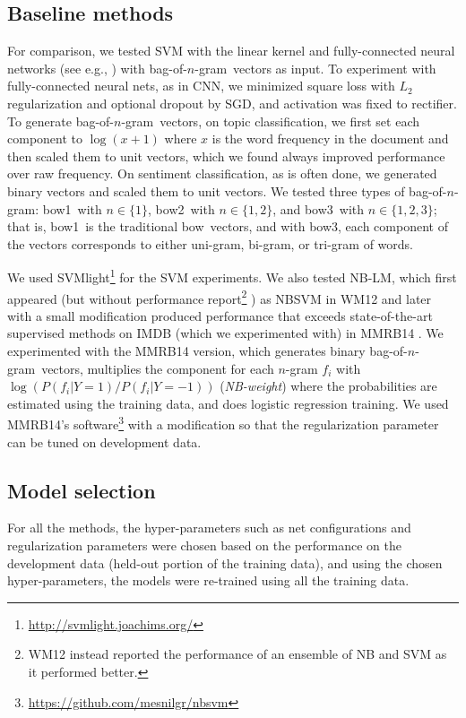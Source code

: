 \documentclass[11pt,letterpaper]{article}
\makeatletter
\newcommand{\cnn}{CNN}
\newcommand{\bow}{{bow}}
\newcommand{\bowone}{{bow1}}
\newcommand{\bowtwo}{{bow2}}
\newcommand{\bowthree}{{bow3}}
\newcommand{\bongram}{bag-of-$n$-gram}
\newcommand{\nbw}{NB-LM}
\newcommand\tightpara{\@startsection{paragraph}{4}{\z@}{1ex plus
   0ex minus 0.2ex}{-1em}{\normalsize\bf}}
\makeatother
\begin{document}
\subsection{Baseline methods} 
For comparison, we tested SVM
with the linear kernel and 
fully-connected neural networks
(see e.g., )
with \bongram\ vectors as input.  
To experiment with fully-connected neural nets, 
as in \cnn, we minimized square loss 
with $L_2$ regularization 
and optional dropout
by SGD, and activation was fixed 
to rectifier.  
To generate \bongram\ vectors, 
on topic classification, 
we first set each component to $\log(x+1)$ 
where $x$ is the word frequency in the document and then scaled them to unit vectors, 
which we found always improved performance over raw frequency.  
On sentiment classification, as is often done, we generated binary vectors and scaled them 
to unit vectors. 
We tested three types of \bongram: 
\bowone\ with $n \in \{1\}$, \bowtwo\ with $n \in \{1,2\}$, and \bowthree\ with $n \in \{1,2,3\}$; 
that is, \bowone\ is the traditional \bow\ vectors, and 
with \bowthree, each component of the vectors corresponds to either uni-gram, bi-gram, 
or tri-gram of words.  




We used SVMlight\footnote{
  \url{http://svmlight.joachims.org/}
}
for the SVM experiments.  
\tightpara{\nbw}
We also tested \nbw, which first appeared (but without performance report\footnote{
  WM12 instead reported the performance of an ensemble of NB and SVM as it performed better.  
}
) as NBSVM in WM12 \cite{WM12} and later with a small modification 
produced 
performance that exceeds state-of-the-art supervised methods 
on IMDB (which we experimented with) 
in MMRB14 \cite{MMRB14}.  
We experimented with the MMRB14 version, which 
generates binary \bongram\ vectors, multiplies the component 
for each $n$-gram $f_i$ with $\log(P(f_i|Y=1)/P(f_i|Y=-1))$
({\em NB-weight}) where the probabilities are estimated using the training data, 
and does logistic regression training.  
We used MMRB14's software\footnote{
  \url{https://github.com/mesnilgr/nbsvm}
} with a modification so that the regularization parameter
can be tuned on development data.  

\subsection{Model selection}
\label{sec:protocol}
For all the methods, 
the hyper-parameters such as net configurations and 
regularization parameters were chosen 
based on the performance on the development data (held-out portion of the training data), 
and using the chosen hyper-parameters, the models were re-trained using all the training 
data.   
\end{document}
